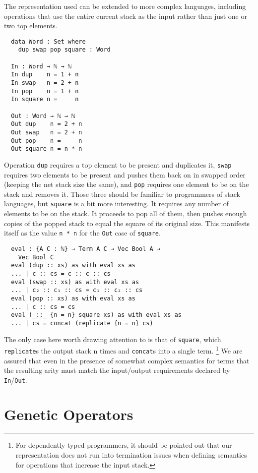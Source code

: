 \documentclass{acm_proc_article-sp}
\begin{document}
The representation used can be extended to more complex languages,
including operations that use the entire current stack as the input
rather than just one or two top elements.

\begin{verbatim}
  data Word : Set where
    dup swap pop square : Word

  In : Word → ℕ → ℕ
  In dup    n = 1 + n
  In swap   n = 2 + n
  In pop    n = 1 + n
  In square n =     n

  Out : Word → ℕ → ℕ
  Out dup    n = 2 + n
  Out swap   n = 2 + n
  Out pop    n =     n
  Out square n = n * n
\end{verbatim}

Operation \texttt{dup} requires a top element to be present and
duplicates it, \texttt{swap} requires two elements to be present and
pushes them back on in swapped order (keeping the net stack size the
same), and \texttt{pop} requires one element to be on the stack and
removes it. Those three should be familiar to programmers of stack
languages, but \texttt{square} is a bit more interesting. It requires
any number of elements to be on the stack. It proceeds to pop all of
them, then pushes enough copies of the popped stack to equal the
square of its original size. This manifests itself as the value
\texttt{n * n} for the \texttt{Out} case of \texttt{square}.

\begin{verbatim}
  eval : {A C : ℕ} → Term A C → Vec Bool A →
    Vec Bool C
  eval (dup :: xs) as with eval xs as
  ... | c :: cs = c :: c :: cs
  eval (swap :: xs) as with eval xs as
  ... | c₂ :: c₁ :: cs = c₁ :: c₂ :: cs
  eval (pop :: xs) as with eval xs as
  ... | c :: cs = cs
  eval (_::_ {n = n} square xs) as with eval xs as
  ... | cs = concat (replicate {n = n} cs)
\end{verbatim}

The only case here worth drawing attention to is that of
\texttt{square}, which \texttt{replicate}s the output stack n times
and \texttt{concat}s into a single term.
\footnote{For dependently typed programmers, it should be pointed out
  that our representation does not run into termination issues when
  defining semantics for operations that increase the input stack. }
We are assured that even in the presence of somewhat complex semantics
for terms that the resulting arity must match the input/output
requirements declared by \texttt{In}/\texttt{Out}.

\section{Genetic Operators}
\end{document}
